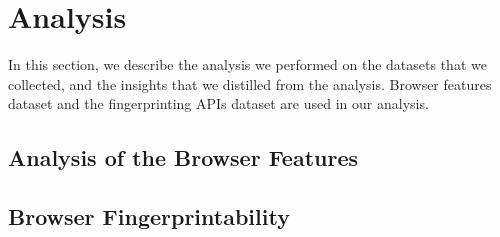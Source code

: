 \section{Analysis}
\label{sec:analysis}

In this section, we describe the analysis we performed on the datasets
that we collected, and the insights that we distilled from the
analysis. Browser features dataset and the fingerprinting APIs dataset
are used in our analysis.

\subsection{Analysis of the Browser Features}



\subsection{Browser Fingerprintability}



% 
